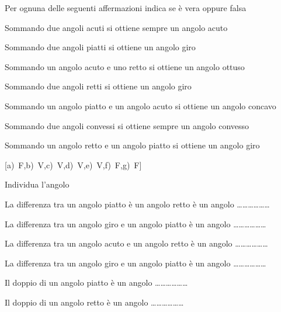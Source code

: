 \begin{esercizio}
\label{ese:1.77}
Per ognuna delle seguenti affermazioni indica se è vera oppure falsa
\vspace{-6pt}
\begin{enumeratea}
\item Sommando due angoli acuti si ottiene sempre un angolo acuto
\hfill\boxV\quad\boxF
\item Sommando due angoli piatti si ottiene un angolo giro
\hfill\boxV\quad\boxF
\item Sommando un angolo acuto e uno retto si ottiene un angolo ottuso
\hfill\boxV\quad\boxF
\item Sommando due angoli retti si ottiene un angolo giro
\hfill\boxV\quad\boxF
\item Sommando un angolo piatto e un angolo acuto si ottiene un 
angolo concavo
\hfill\boxV\quad\boxF
\item Sommando due angoli convessi si ottiene sempre un angolo convesso
\hfill\boxV\quad\boxF
\item Sommando un angolo retto e un angolo piatto si ottiene un 
angolo giro
\hfill\boxV\quad\boxF
\end{enumeratea}
\hfill[a)~F,\quad b)~V,\quad c)~V,\quad d)~V,\quad e)~V,\quad f)~F,\quad g)~F]
\end{esercizio}

\begin{esercizio}
\label{ese:1.78}
Individua l'angolo
\vspace{-6pt}
\begin{enumeratea}
\item La differenza tra un angolo piatto è un angolo retto è un 
angolo \ldots\ldots\ldots\ldots\ldots\ldots{}
\item La differenza tra un angolo giro e un angolo piatto è un angolo 
\ldots\ldots\ldots\ldots\ldots\ldots{}
\item La differenza tra un angolo acuto e un angolo retto è un angolo 
\ldots\ldots\ldots\ldots\ldots\ldots{}
\item La differenza tra un angolo giro e un angolo piatto è un angolo 
\ldots\ldots\ldots\ldots\ldots\ldots{}
\item Il doppio di un angolo piatto è un angolo 
\ldots\ldots\ldots\ldots\ldots\ldots{}
\item Il doppio di un angolo retto è un angolo 
\ldots\ldots\ldots\ldots\ldots\ldots{}
\end{enumeratea}
\end{esercizio}
	
